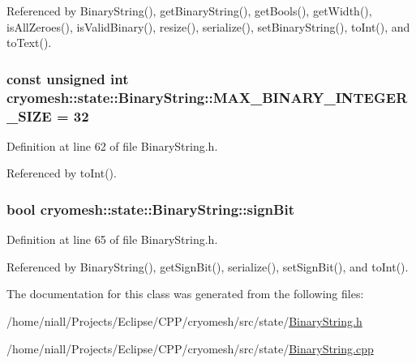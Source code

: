 \-Referenced by \-Binary\-String(), get\-Binary\-String(), get\-Bools(), get\-Width(), is\-All\-Zeroes(), is\-Valid\-Binary(), resize(), serialize(), set\-Binary\-String(), to\-Int(), and to\-Text().

\hypertarget{classcryomesh_1_1state_1_1BinaryString_abd1c70d0aef65ad2ba5af998a22b01ab}{
\subsubsection[{\-M\-A\-X\-\_\-\-B\-I\-N\-A\-R\-Y\-\_\-\-I\-N\-T\-E\-G\-E\-R\-\_\-\-S\-I\-Z\-E}]{\setlength{\rightskip}{0pt plus 5cm}const unsigned int {\bf cryomesh\-::state\-::\-Binary\-String\-::\-M\-A\-X\-\_\-\-B\-I\-N\-A\-R\-Y\-\_\-\-I\-N\-T\-E\-G\-E\-R\-\_\-\-S\-I\-Z\-E} = 32}}\label{classcryomesh_1_1state_1_1BinaryString_abd1c70d0aef65ad2ba5af998a22b01ab}


\-Definition at line 62 of file \-Binary\-String.\-h.



\-Referenced by to\-Int().

\hypertarget{classcryomesh_1_1state_1_1BinaryString_a82a7189edccf834f144e4717294bb505}{
\subsubsection[{sign\-Bit}]{\setlength{\rightskip}{0pt plus 5cm}bool {\bf cryomesh\-::state\-::\-Binary\-String\-::sign\-Bit}}}\label{classcryomesh_1_1state_1_1BinaryString_a82a7189edccf834f144e4717294bb505}


\-Definition at line 65 of file \-Binary\-String.\-h.



\-Referenced by \-Binary\-String(), get\-Sign\-Bit(), serialize(), set\-Sign\-Bit(), and to\-Int().



\-The documentation for this class was generated from the following files\-:\begin{DoxyCompactItemize}
\item 
/home/niall/\-Projects/\-Eclipse/\-C\-P\-P/cryomesh/src/state/\hyperlink{BinaryString_8h}{\-Binary\-String.\-h}\item 
/home/niall/\-Projects/\-Eclipse/\-C\-P\-P/cryomesh/src/state/\hyperlink{BinaryString_8cpp}{\-Binary\-String.\-cpp}\end{DoxyCompactItemize}
